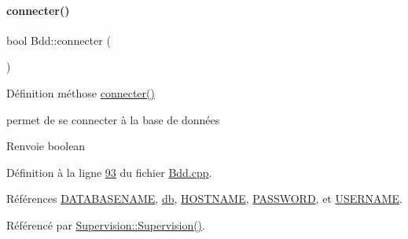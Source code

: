 \paragraph{\texorpdfstring{connecter()}{connecter()}}
{\footnotesize\ttfamily bool Bdd\+::connecter (\begin{DoxyParamCaption}{ }\end{DoxyParamCaption})}



Définition méthose \hyperlink{class_bdd_a1a234e773787295f521d66685149176b}{connecter()} 

permet de se connecter à la base de données \begin{DoxyReturn}{Renvoie}
boolean 
\end{DoxyReturn}


Définition à la ligne \hyperlink{_bdd_8cpp_source_l00093}{93} du fichier \hyperlink{_bdd_8cpp_source}{Bdd.\+cpp}.



Références \hyperlink{_bdd_8h_source_l00013}{D\+A\+T\+A\+B\+A\+S\+E\+N\+A\+ME}, \hyperlink{_bdd_8h_source_l00063}{db}, \hyperlink{_bdd_8h_source_l00010}{H\+O\+S\+T\+N\+A\+ME}, \hyperlink{_bdd_8h_source_l00012}{P\+A\+S\+S\+W\+O\+RD}, et \hyperlink{_bdd_8h_source_l00011}{U\+S\+E\+R\+N\+A\+ME}.



Référencé par \hyperlink{_supervision_8cpp_source_l00036}{Supervision\+::\+Supervision()}.


